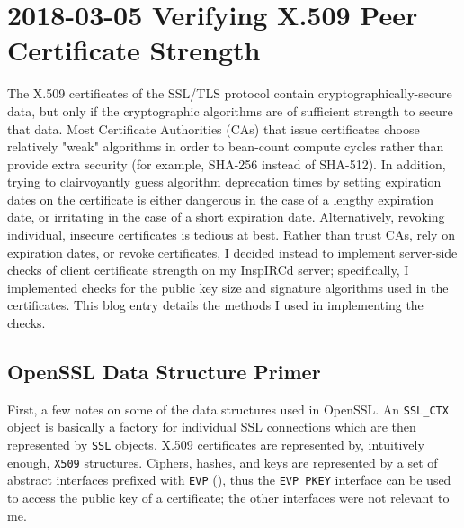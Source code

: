 \documentclass{article}
\begin{document}
\section{2018-03-05 Verifying X.509 Peer Certificate Strength}
The\label{2018-03-05-peer-cert-strength} X.509 certificates of the SSL/TLS protocol contain cryptographically-secure data, but only if the cryptographic algorithms are of sufficient strength to secure that data.  Most Certificate Authorities (CAs) that issue certificates choose relatively "weak" algorithms in order to bean-count compute cycles rather than provide extra security (for example, SHA-256 instead of SHA-512).  In addition, trying to clairvoyantly guess algorithm deprecation times by setting expiration dates on the certificate is either dangerous in the case of a lengthy expiration date, or irritating in the case of a short expiration date.  Alternatively, revoking individual, insecure certificates is tedious at best.  Rather than trust CAs, rely on expiration dates, or revoke certificates, I decided instead to implement server-side checks of client certificate strength on my InspIRCd server; specifically, I implemented checks for the public key size and signature algorithms used in the certificates.  This blog entry details the  methods I used in implementing the checks.

\subsection{OpenSSL Data Structure Primer}
First, a few notes on some of the data structures used in OpenSSL.  An \texttt{SSL_CTX} object is basically a factory for individual SSL connections which are then represented by \texttt{SSL} objects.  X.509 certificates are represented by, intuitively enough, \texttt{X509} structures.  Ciphers, hashes, and keys are represented by a set of abstract interfaces prefixed with \texttt{EVP} (), thus the \texttt{EVP_PKEY} interface can be used to access the public key of a certificate; the other interfaces were not relevant to me.
\end{document}
